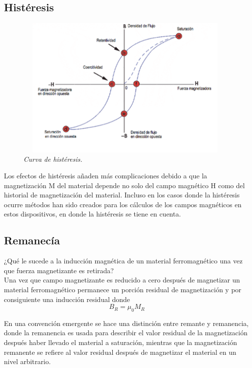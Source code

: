 \subsection{Histéresis}

\begin{figure}[htb]
\begin{center}
\centering
	\includegraphics[width=11cm, height=7cm]{images/Capitulo_1/Curva_de_histeresis}
	\caption{\textit{Curva de histéresis.}}
	\label{fig:system:example1}	
\end{center}
\end{figure}

Los efectos de histéresis añaden más complicaciones debido a que la magnetización M  del material depende no solo del campo magnético H como del historial de magnetización del material. Incluso en los casos donde la histéresis ocurre métodos han sido creados para los cálculos de los campos magnéticos en estos dispositivos, en donde la histéresis se tiene en cuenta.

\subsection{Remanecía}

¿Qué le sucede a la inducción magnética de un material ferromagnético una vez que fuerza magnetizante es retirada?\\
Una vez que campo magnetizante es reducido a cero después de magnetizar un material ferromagnético permanece un porción residual de magnetización y por consiguiente una inducción residual donde
\begin{equation}
	B_R=\mu_0 M_R
\end{equation}

En una convención emergente se hace una distinción entre remante y remanencia, donde la remanencia es usada para describir el valor residual de la magnetización después haber llevado el material a saturación, mientras que la magnetización remanente  se refiere al valor residual después de magnetizar el material en un nivel arbitrario.

